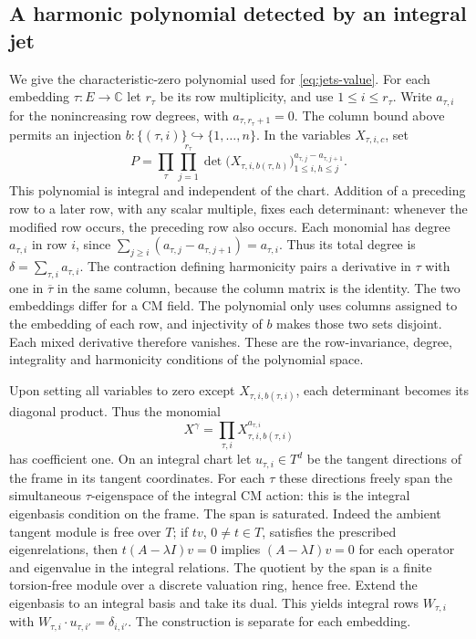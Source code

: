 \subsection{A harmonic polynomial detected by an integral jet}

We give the characteristic-zero polynomial used for
\eqref{eq:jets-value}. For each embedding \(\tau:E\to\mathbb C\)
let \(r_\tau\) be its row multiplicity, and use \(1\le i\le r_\tau\).
Write \(a_{\tau,i}\) for the nonincreasing row degrees, with
\(a_{\tau,r_\tau+1}=0\). The column bound above permits an injection
\(b:\{(\tau,i)\}\hookrightarrow\{1,\ldots,n\}\).
In the variables \(X_{\tau,i,c}\), set
\[
 P=\prod_{\tau}\prod_{j=1}^{r_\tau}
 \det\!\big(X_{\tau,i,b(\tau,h)}\big)_{1\le i,h\le j}^{
                        a_{\tau,j}-a_{\tau,j+1}} .
\]
This polynomial is integral and independent of the chart. Addition of
a preceding row to a later row, with any scalar multiple, fixes each
determinant: whenever the modified row occurs, the preceding row also
occurs. Each monomial has degree \(a_{\tau,i}\) in row \(i\), since
\(\sum_{j\ge i}(a_{\tau,j}-a_{\tau,j+1})=a_{\tau,i}\). Thus its total
degree is \(\delta=\sum_{\tau,i}a_{\tau,i}\).
The contraction defining harmonicity pairs a derivative in \(\tau\)
with one in \(\overline\tau\) in the same column, because the column
matrix is the identity. The two embeddings differ for a CM field.
The polynomial only uses columns assigned to the embedding of each
row, and injectivity of \(b\) makes those two sets disjoint. Each
mixed derivative therefore vanishes. These are the row-invariance,
degree, integrality and harmonicity conditions of the polynomial space.

Upon setting all variables to zero except
\(X_{\tau,i,b(\tau,i)}\), each determinant becomes its diagonal
product. Thus the monomial
\[
    X^\gamma=\prod_{\tau,i}
       X_{\tau,i,b(\tau,i)}^{a_{\tau,i}}
\]
has coefficient one. On an integral chart let
\(u_{\tau,i}\in T^d\) be the tangent directions of the frame in its
tangent coordinates. For each \(\tau\) these directions freely span
the simultaneous \(\tau\)-eigenspace of the integral CM action:
this is the integral eigenbasis condition on the frame. The span
is saturated. Indeed the ambient tangent module is free over \(T\);
if \(t v\), \(0\ne t\in T\), satisfies the prescribed eigenrelations,
then \(t(A-\lambda I)v=0\) implies \((A-\lambda I)v=0\) for each
operator and eigenvalue in the integral relations. The quotient
by the span is a finite torsion-free module over a discrete
valuation ring, hence free. Extend the eigenbasis to an integral
basis and take its dual. This yields integral rows \(W_{\tau,i}\)
with \(W_{\tau,i}\cdot u_{\tau,i'}=\delta_{i,i'}\).
The construction is separate for each embedding.

